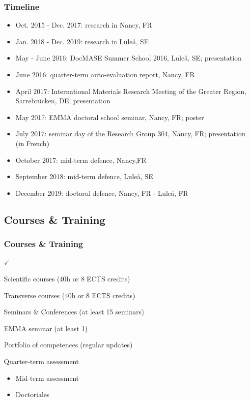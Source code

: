 \documentclass[first,firstsupp,lastsupp,last,hyperref,table]{ETHclass}
\begin{document}
\begin{frame}
\frametitle{\small Timeline}
\vspace{-0.75cm}
\centering
\scriptsize
\begin{itemize}[label=]
\item Oct. 2015 - Dec. 2017: research in Nancy, FR
\item Jan. 2018 - Dec. 2019: research in Lule\aa, SE\\[20pt]
\item May - June 2016: DocMASE Summer School 2016, Lule\aa, SE; presentation
\item June 2016: quarter-term auto-evaluation report, Nancy, FR
\item April 2017: International Materials Research Meeting of the Greater Region, Sarrebr\"ucken, DE; presentation
\item May 2017: EMMA doctoral school seminar, Nancy, FR; poster
\item July 2017: seminar day of the Research Group 304, Nancy, FR; presentation (in French)
\item October 2017: mid-term defence, Nancy,FR
\item September 2018: mid-term defence, Lule\aa, SE
\item December 2019: doctoral defence, Nancy, FR - Lule\aa, FR
\end{itemize}
\end{frame}

\subsection{Courses \& Training}

\begin{frame}
\frametitle{\small Courses \& Training}
\vspace{-0.75cm}
\centering
\scriptsize
\begin{list}{\Large\textcolor{green}{$\mathbf{\checkmark}$}}{}
\item Scientific courses (40h or 8 ECTS credits)
\item Transverse courses (40h or 8 ECTS credits)
\item Seminars \& Conferences (at least 15 seminars)
\item EMMA seminar (at least 1)
\item Portfolio of competences (regular updates)
\item Quarter-term assessment
\end{list}
\begin{itemize}[label=]
\item Mid-term assessment
\item Doctoriales
\end{itemize}
\end{frame}
\end{document}
